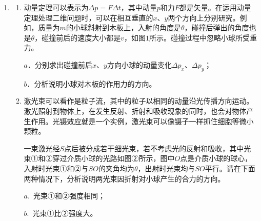 \begin{enumerate}[leftmargin=0em]
\newpage
\item 
{}

\begin{enumerate}
\renewcommand{\labelenumi}{\arabic{enumi}.}
\item
动量定理可以表示为$ \Delta p=F \Delta t $，其中动量$ p $和力$ F $都是矢量。在运用动量定理处理二维问题时，可以在相互垂直的$ x $、$ y $两个方向上分别研究。例如，质量为$ m $的小球斜射到木板上，入射的角度是$ \theta $，碰撞后弹出的角度也是$ \theta $，碰撞前后的速度大小都是$ v $，如图$ 1 $所示。碰撞过程中忽略小球所受重力。
\begin{figure}[h!]
\centering

\end{figure}

$ a $．分别求出碰撞前后$ x $、$ y $方向小球的动量变化$ \Delta p_x $、$ \Delta p_y $；

$ b $．分析说明小球对木板的作用力的方向。

\item 
激光束可以看作是粒子流，其中的粒子以相同的动量沿光传播方向运动。激光照射到物体上，在发生反射、折射和吸收现象的同时，也会对物体产生作用。光镊效应就是一个实例，激光束可以像镊子一样抓住细胞等微小颗粒。
\begin{figure}[h!]
\centering

\end{figure}

一束激光经$ S $点后被分成若干细光束，若不考虑光的反射和吸收，其中光束①和②穿过介质小球的光路如图②所示，图中$ O $点是介质小球的球心，入射时光束①和②与$ SO $的夹角均为$ \theta $，出射时光束均与$ SO $平行。请在下面两种情况下，分析说明两光束因折射对小球产生的合力的方向。

$ a $. 光束①和②强度相同；

$ b $. 光束①比②强度大。 




\end{enumerate}


\end{enumerate}
